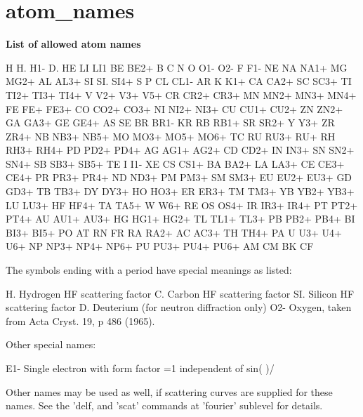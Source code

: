 \section{atom\_names}
{\bf List of allowed atom names \par }
\par
\begin{MacVerbatim}
H    H.   H1-  D.   HE   LI   LI1  BE   BE2+ B    C    N    O    O1-
O2-  F    F1-  NE   NA   NA1+ MG   MG2+ AL   AL3+ SI   SI.  SI4+ S
P    CL   CL1- AR   K    K1+  CA   CA2+ SC   SC3+ TI   TI2+ TI3+ TI4+
V    V2+  V3+  V5+  CR   CR2+ CR3+ MN   MN2+ MN3+ MN4+ FE   FE+  FE3+
CO   CO2+ CO3+ NI   NI2+ NI3+ CU   CU1+ CU2+ ZN   ZN2+ GA   GA3+ GE
GE4+ AS   SE   BR   BR1- KR   RB   RB1+ SR   SR2+ Y    Y3+  ZR   ZR4+
NB   NB3+ NB5+ MO   MO3+ MO5+ MO6+ TC   RU   RU3+ RU+  RH   RH3+ RH4+
PD   PD2+ PD4+ AG   AG1+ AG2+ CD   CD2+ IN   IN3+ SN   SN2+ SN4+ SB
SB3+ SB5+ TE   I    I1-  XE   CS   CS1+ BA   BA2+ LA   LA3+ CE   CE3+
CE4+ PR   PR3+ PR4+ ND   ND3+ PM   PM3+ SM   SM3+ EU   EU2+ EU3+ GD
GD3+ TB   TB3+ DY   DY3+ HO   HO3+ ER   ER3+ TM   TM3+ YB   YB2+ YB3+
LU   LU3+ HF   HF4+ TA   TA5+ W    W6+  RE   OS   OS4+ IR   IR3+ IR4+
PT   PT2+ PT4+ AU   AU1+ AU3+ HG   HG1+ HG2+ TL   TL1+ TL3+ PB   PB2+
PB4+ BI   BI3+ BI5+ PO   AT   RN   FR   RA   RA2+ AC   AC3+ TH   TH4+
PA   U    U3+  U4+  U6+  NP   NP3+ NP4+ NP6+ PU   PU3+ PU4+ PU6+ AM
CM   BK   CF
\end{MacVerbatim}
\vspace{3pt}
The symbols ending with a period have special meanings as listed: 
\par
\begin{MacVerbatim}
H.   Hydrogen HF scattering factor
C.   Carbon HF scattering factor
SI.  Silicon HF scattering factor
D.   Deuterium (for neutron diffraction only)
O2-  Oxygen, taken from Acta Cryst. 19, p 486 (1965).
\end{MacVerbatim}
Other special names: 
\par
\begin{MacVerbatim}
E1-  Single electron with form factor =1 independent of sin( )/
\end{MacVerbatim}
Other names may be used as well, if scattering curves are supplied for 
these names. See the 'delf, and 'scat' commands at 'fourier' sublevel 
for details. 
